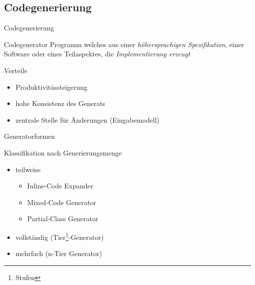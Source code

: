 \subsection{Codegenerierung}
\begin{frame}{Codegenerierung}

    \begin{block}{Codegenerator}
        Programm welches aus einer \emph{höhersprachigen Spezifikation}, einer Software oder eines Teilaspektes, die \emph{Implementierung erzeugt}
    \end{block}
    \begin{block}{Vorteile}
        \begin{itemize}
            \item Produktivitässteigerung
            \item hohe Konsistenz des Generats
            \item zentrale Stelle für Änderungen (Eingabemodell)
        \end{itemize}
    \end{block}
\end{frame}

\begin{frame}{Generatorformen}
    \begin{block}{Klassifikation nach Generierungsmenge}
        \begin{itemize}
            \item teilweise
            \begin{itemize}
                \item Inline-Code Expander
                \item Mixed-Code Generator
                \item Partial-Class Generator
            \end{itemize}
            \item vollständig (Tier\footnote{Stufen}-Generator)
            \item mehrfach (n-Tier Generator)
        \end{itemize}
    \end{block}
\end{frame}

